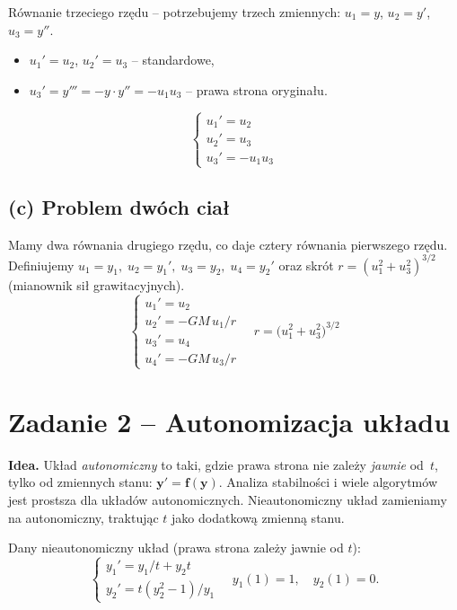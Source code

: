 \documentclass[a4paper,12pt]{article}
\begin{document}
Równanie trzeciego rzędu -- potrzebujemy trzech zmiennych:
$u_1 = y$, $u_2 = y'$, $u_3 = y''$.
\begin{itemize}
  \item $u_1' = u_2$, \quad $u_2' = u_3$ \quad -- standardowe,
  \item $u_3' = y''' = -y \cdot y'' = -u_1 u_3$ \quad -- prawa strona oryginału.
\end{itemize}
\[
\boxed{
\begin{cases}
u_1' = u_2 \\
u_2' = u_3 \\
u_3' = -u_1 u_3
\end{cases}
}
\]

\subsection*{(c) Problem dwóch ciał}

Mamy dwa równania drugiego rzędu, co daje cztery równania pierwszego rzędu.
Definiujemy $u_1 = y_1,\; u_2 = y_1',\; u_3 = y_2,\; u_4 = y_2'$
oraz skrót $r = (u_1^2 + u_3^2)^{3/2}$ (mianownik sił grawitacyjnych).
\[
\boxed{
\begin{cases}
u_1' = u_2 \\
u_2' = -GM\,u_1 / r \\
u_3' = u_4 \\
u_4' = -GM\,u_3 / r
\end{cases}
}
\quad r = \bigl(u_1^2 + u_3^2\bigr)^{3/2}
\]

\section*{Zadanie 2 -- Autonomizacja układu}

\begin{komentarz}
\textbf{Idea.} Układ \emph{autonomiczny} to taki, gdzie prawa strona nie zależy
\emph{jawnie} od~$t$, tylko od zmiennych stanu: $\mathbf{y}' = \mathbf{f}(\mathbf{y})$.
Analiza stabilności i wiele algorytmów jest prostsza dla układów autonomicznych.
Nieautonomiczny układ zamieniamy na autonomiczny, traktując $t$ jako dodatkową zmienną stanu.
\end{komentarz}

Dany nieautonomiczny układ (prawa strona zależy jawnie od $t$):
\[
\begin{cases}
y_1' = y_1/t + y_2 t \\
y_2' = t(y_2^2 - 1)/y_1
\end{cases}
\quad y_1(1)=1,\quad y_2(1)=0.
\]
\end{document}
